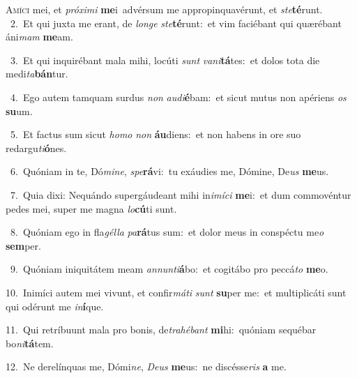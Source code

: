 \lettrine{\initial\textcolor{\initialcolor}{A}}{míci} mei, et \textit{pró}\-\textit{xi}\textit{mi} \textbf{me}\-i~\star advérsum me appropinquavérunt, et \textit{ste}\-\textbf{té}runt.\\
{\numbfont\textcolor{\numbcolor}{~2.}}~Et qui juxta me erant, de \textit{lon}\-\textit{ge} \textit{ste}\-\textbf{té}runt:~\star et vim faciébant qui quærébant áni\textit{mam} \textbf{me}\-am.\par
{\numbfont\textcolor{\numbcolor}{~3.}}~Et qui inquirébant mala mihi, locúti \textit{sunt} \textit{va}\-\textit{ni}\textbf{tá}tes:~\star et dolos tota die medi\-\textit{ta}\-\textbf{bán}tur.\par
{\numbfont\textcolor{\numbcolor}{~4.}}~Ego autem tamquam surdus \textit{non} \textit{au}\-\textit{di}\textbf{é}bam:~\star et sicut mutus non apériens \textit{os} \textbf{su}\-um.\par
{\numbfont\textcolor{\numbcolor}{~5.}}~Et factus sum sicut \textit{ho}\-\textit{mo} \textit{non} \textbf{áu}\-diens:~\star et non habens in ore suo redargu\-\textit{ti}\-\textbf{ó}nes.\par
{\numbfont\textcolor{\numbcolor}{~6.}}~Quóniam in te, Dó\-\textit{mi}\-\textit{ne}, \textit{spe}\-\textbf{rá}vi:~\star tu exáudies me, Dómine, De\textit{us} \textbf{me}\-us.\par
{\numbfont\textcolor{\numbcolor}{~7.}}~Quia dixi: Nequándo supergáudeant mihi in\-\textit{i}\-\textit{mí}\textit{ci} \textbf{me}\-i:~\star et dum commovéntur pedes mei, super me magna \textit{lo}\-\textbf{cú}ti sunt.\par
{\numbfont\textcolor{\numbcolor}{~8.}}~Quóniam ego in fla\-\textit{gél}\-\textit{la} \textit{pa}\-\textbf{rá}tus sum:~\star et dolor meus in conspéctu me\textit{o} \textbf{sem}\-per.\par
{\numbfont\textcolor{\numbcolor}{~9.}}~Quóniam iniquitátem meam \textit{an}\-\textit{nun}\textit{ti}\textbf{á}bo:~\star et cogitábo pro peccá\textit{to} \textbf{me}\-o.\par
{\numbfont\textcolor{\numbcolor}{10.}}~Inimíci autem mei vivunt, et confir\-\textit{má}\-\textit{ti} \textit{sunt} \textbf{su}\-per me:~\star et multiplicáti sunt qui odérunt me \textit{in}\-\textbf{í}que.\par
{\numbfont\textcolor{\numbcolor}{11.}}~Qui retríbuunt mala pro bonis, de\-\textit{tra}\-\textit{hé}\textit{bant} \textbf{mi}\-hi:~\star quóniam sequébar bo\-\textit{ni}\-\textbf{tá}tem.\par
{\numbfont\textcolor{\numbcolor}{12.}}~Ne derelínquas me, Dómi\-\textit{ne}\-, \textit{De}\-\textit{us} \textbf{me}\-us:~\star ne discésse\textit{ris} \textbf{a} me.\par
